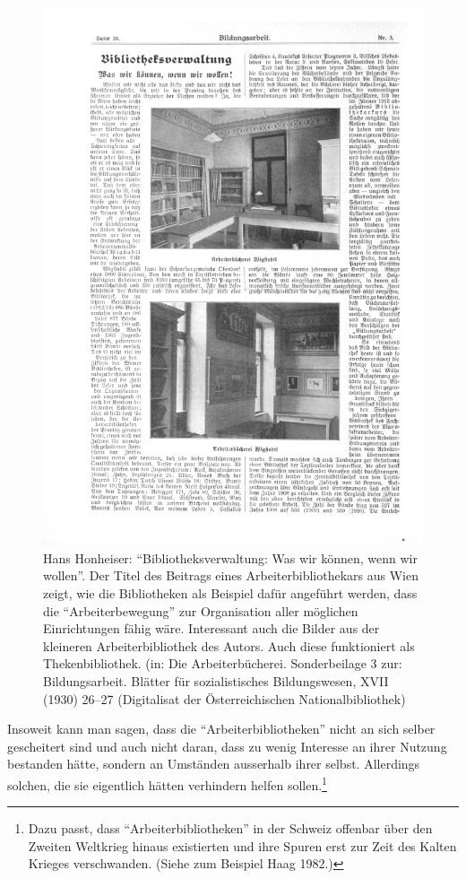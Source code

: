 \documentclass[a4paper,
fontsize=11pt,
oneside,
numbers=noperiodatend,
parskip=half-,
bibliography=totoc,
final
]{scrartcl}
\begin{document}
\begin{figure}
\centering
\includegraphics[width=.8\textwidth]{img/Schuldt06.jpg}
\caption{Hans Honheiser: \enquote{Bibliotheksverwaltung: Was wir können,
wenn wir wollen}. Der Titel des Beitrags eines Arbeiterbibliothekars aus
Wien zeigt, wie die Bibliotheken als Beispiel dafür angeführt werden,
dass die \enquote{Arbeiterbewegung} zur Organisation aller möglichen
Einrichtungen fähig wäre. Interessant auch die Bilder aus der kleineren
Arbeiterbibliothek des Autors. Auch diese funktioniert als
Thekenbibliothek. (in: Die Arbeiterbücherei. Sonderbeilage 3 zur:
Bildungsarbeit. Blätter für sozialistisches Bildungswesen, XVII (1930)
26--27 (Digitalisat der Österreichischen Nationalbibliothek)}
\end{figure}

Insoweit kann man sagen, dass die \enquote{Arbeiterbibliotheken} nicht
an sich selber gescheitert sind und auch nicht daran, dass zu wenig
Interesse an ihrer Nutzung bestanden hätte, sondern an Umständen
ausserhalb ihrer selbst. Allerdings solchen, die sie eigentlich hätten
verhindern helfen sollen.\footnote{Dazu passt, dass
  \enquote{Arbeiterbibliotheken} in der Schweiz offenbar über den
  Zweiten Weltkrieg hinaus existierten und ihre Spuren erst zur Zeit des
  Kalten Krieges verschwanden. (Siehe zum Beispiel Haag 1982.)}
\end{document}
